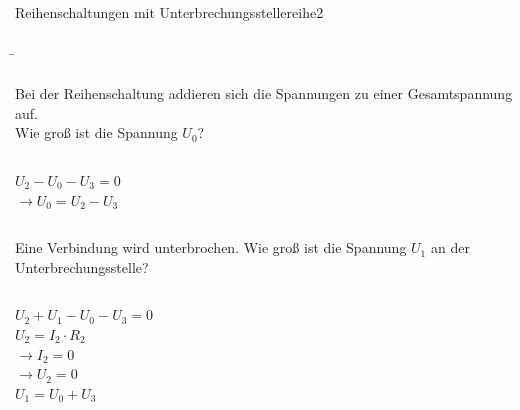 \begin{frame}
{\begin{bsp}{Reihenschaltungen mit Unterbrechungsstelle}{reihe2}
		\end{bsp}

	}

	\newpage

	\b{

		\begin{columns}

			\vspace{-50pt}
			Bei der Reihenschaltung addieren sich die Spannungen zu einer
			Gesamtspannung auf.\\
			Wie groß ist die Spannung $U_0$?



			

		\end{columns}

		\begin{columns}
			\column[t]{0.6\textwidth}

			\pause

			\vspace{-30pt}
			$U_2-U_0-U_3 =0$\\
			$\rightarrow U_0 = U_2- U_3$

			\column[t]{0.4\textwidth}

			\phantom{.}\\

		\end{columns}

		\begin{columns}
			\pause

			Eine Verbindung wird unterbrochen. Wie groß ist die Spannung $U_1$ an
			der Unterbrechungsstelle?


			

		\end{columns}

		\pause

		\begin{columns}
			\column[t]{0.6\textwidth}

			\vspace{-55pt}

			$U_2+U_1-U_0-U_3 = 0$\\
			$U_2=I_2 \cdot R_2$\\
			$\rightarrow I_2 = 0$\\
			$\rightarrow U_2 = 0$\\
			$U_1 = U_0 + U_3$


\end{columns}}
\end{frame}
